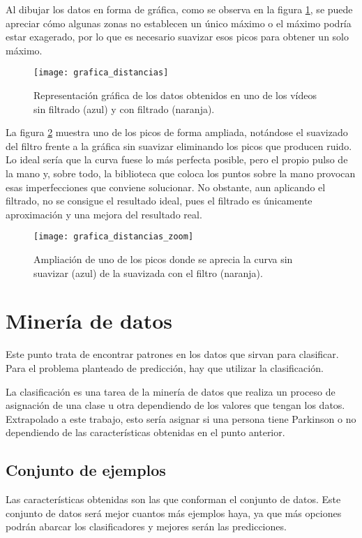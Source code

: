 Al dibujar los datos en forma de gráfica, como se observa en la figura \ref{fig:graficadistancias}, se puede apreciar cómo algunas zonas no establecen un único máximo o el máximo podría estar exagerado, por lo que es necesario suavizar esos picos para obtener un solo máximo. 

\begin{figure}[h]
	\texttt{[image: grafica\_distancias]}
	\centering
	\caption[Representación gráfica de los datos obtenidos en uno de los vídeos con y sin filtrado.]{Representación gráfica de los datos obtenidos en uno de los vídeos sin filtrado (azul) y con filtrado (naranja).}
	\label{fig:graficadistancias}
\end{figure}

La figura \ref{fig:graficadistanciaszoom} muestra uno de los picos de forma ampliada, notándose el suavizado del filtro frente a la gráfica sin suavizar eliminando los picos que producen ruido. Lo ideal sería que la curva fuese lo más perfecta posible, pero el propio pulso de la mano y, sobre todo, la biblioteca que coloca los puntos sobre la mano provocan esas imperfecciones que conviene solucionar. No obstante, aun aplicando el filtrado, no se consigue el resultado ideal, pues el filtrado es únicamente aproximación y una mejora del resultado real.

\begin{figure}[h]
	\texttt{[image: grafica\_distancias\_zoom]}
	\caption[Ampliación de uno de los picos donde se aprecia la curva con y sin suavizado.]{Ampliación de uno de los picos donde se aprecia la curva sin suavizar (azul) de la suavizada con el filtro (naranja).}
	\label{fig:graficadistanciaszoom}
\end{figure}

\section{Minería de datos}
Este punto trata de encontrar patrones en los datos que sirvan para clasificar. Para el problema planteado de predicción, hay que utilizar la clasificación.

La clasificación es una tarea de la minería de datos que realiza un proceso de asignación de una clase u otra dependiendo de los valores que tengan los datos. Extrapolado a este trabajo, esto sería asignar si una persona tiene Parkinson o no dependiendo de las características obtenidas en el punto anterior.

\subsection{Conjunto de ejemplos}
Las características obtenidas son las que conforman el conjunto de datos. Este conjunto de datos será mejor cuantos más ejemplos haya, ya que más opciones podrán abarcar los clasificadores y mejores serán las predicciones.


